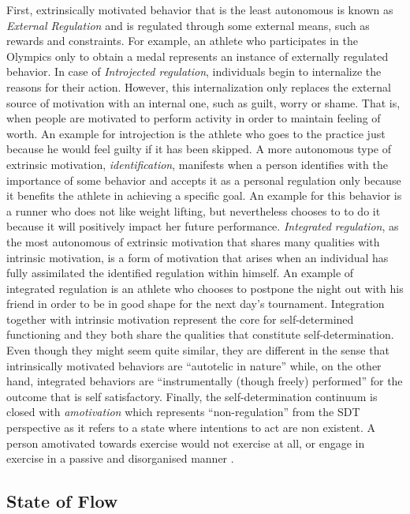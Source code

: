 First, extrinsically motivated behavior that is the least autonomous is known as \textit{External Regulation} and is regulated through some external means, such as rewards and constraints. For example, an athlete who participates in the Olympics only to obtain a medal represents an instance of externally regulated behavior. In case of \textit{Introjected regulation}, individuals begin to internalize the reasons for their action. However, this internalization only replaces the external source of motivation with an internal one, such as guilt, worry or shame. That is, when people are motivated to perform activity in order to maintain feeling of worth. An example for introjection is the athlete who goes to the practice just because he would feel guilty if it has been skipped. A more autonomous type of extrinsic motivation, \textit{identification}, manifests when a person identifies with the importance of some behavior and accepts it as a personal regulation only because it benefits the athlete in achieving a specific goal. An example for this behavior is a runner who does not like weight lifting, but nevertheless chooses to to do it because it will positively impact her future performance. \textit{Integrated regulation}, as the most autonomous of extrinsic motivation that shares many qualities with intrinsic motivation, is a form of motivation that arises when an individual has fully assimilated the identified regulation within himself. An example of integrated regulation is an athlete who chooses to postpone the night out with his friend in order to be in good shape for the next day's tournament. Integration together with intrinsic motivation represent the core for self-determined functioning and they both share the qualities that constitute self-determination. Even though they might seem quite similar, they are different in the sense that intrinsically motivated behaviors are ``autotelic in nature'' while, on the other hand, integrated behaviors are ``instrumentally (though freely) performed'' for the outcome that is self satisfactory.  Finally, the self-determination continuum is closed with  \textit{amotivation} which represents ``non-regulation'' from the SDT perspective as it refers to a state where intentions to act are non existent. A person amotivated towards exercise would not exercise at all, 
or engage in exercise in a passive and disorganised  manner \cite{vallerand2007intrinsic, ryan2000intrinsic, deci1994promoting}.

\subsection{State of Flow}

